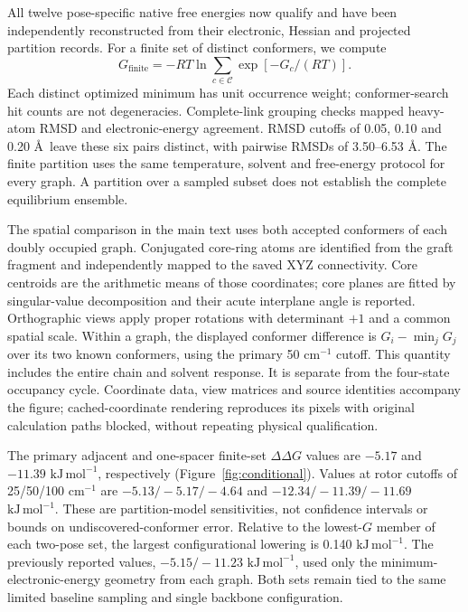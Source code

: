 \documentclass[11pt]{article}
\newcommand{\kj}{\ensuremath{\mathrm{kJ\,mol^{-1}}}}
\begin{document}
All twelve pose-specific native free energies now qualify and have been independently reconstructed from their electronic, Hessian and projected partition records. For a finite set of distinct conformers, we compute
\begin{equation}
G_{\mathrm{finite}}=-RT\ln\sum_{c\in\mathcal C}\exp[-G_c/(RT)].
\end{equation}
Each distinct optimized minimum has unit occurrence weight; conformer-search hit counts are not degeneracies. Complete-link grouping checks mapped heavy-atom RMSD and electronic-energy agreement. RMSD cutoffs of 0.05, 0.10 and 0.20 \AA\ leave these six pairs distinct, with pairwise RMSDs of 3.50--6.53 \AA. The finite partition uses the same temperature, solvent and free-energy protocol for every graph. A partition over a sampled subset does not establish the complete equilibrium ensemble.

The spatial comparison in the main text uses both accepted conformers of each doubly occupied graph. Conjugated core-ring atoms are identified from the graft fragment and independently mapped to the saved XYZ connectivity. Core centroids are the arithmetic means of those coordinates; core planes are fitted by singular-value decomposition and their acute interplane angle is reported. Orthographic views apply proper rotations with determinant $+1$ and a common spatial scale. Within a graph, the displayed conformer difference is $G_i-\min_j G_j$ over its two known conformers, using the primary 50 cm$^{-1}$ cutoff. This quantity includes the entire chain and solvent response. It is separate from the four-state occupancy cycle. Coordinate data, view matrices and source identities accompany the figure; cached-coordinate rendering reproduces its pixels with original calculation paths blocked, without repeating physical qualification.

The primary adjacent and one-spacer finite-set $\Delta\Delta G$ values are $-5.17$ and $-11.39$ \kj, respectively (Figure~\ref{fig:conditional}). Values at rotor cutoffs of 25/50/100 cm$^{-1}$ are $-5.13/-5.17/-4.64$ and $-12.34/-11.39/-11.69$ \kj. These are partition-model sensitivities, not confidence intervals or bounds on undiscovered-conformer error. Relative to the lowest-$G$ member of each two-pose set, the largest configurational lowering is 0.140 \kj. The previously reported values, $-5.15/-11.23$ \kj, used only the minimum-electronic-energy geometry from each graph. Both sets remain tied to the same limited baseline sampling and single backbone configuration.
\end{document}
